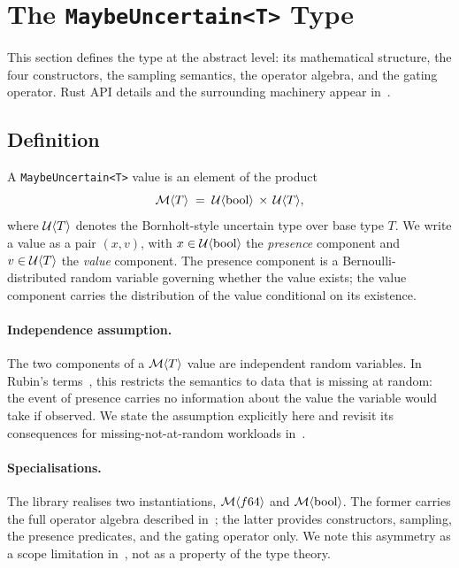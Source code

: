 \section{The \texttt{MaybeUncertain<T>} Type}
\label{sec:type}

This section defines the type at the abstract level: its mathematical
structure, the four constructors, the sampling semantics, the operator
algebra, and the gating operator. Rust API details and the surrounding
machinery appear in~.

\subsection{Definition}
\label{sec:type:def}

A \texttt{MaybeUncertain<T>} value is an element of the product
\begin{equation}
\mathcal{M}\langle T \rangle \;=\; \mathcal{U}\langle \mathrm{bool} \rangle \,\times\, \mathcal{U}\langle T \rangle,
\label{eq:mtype}
\end{equation}
where $\mathcal{U}\langle T \rangle$ denotes the Bornholt-style uncertain type
over base type $T$. We write a value as a pair $(x, v)$, with $x \in
\mathcal{U}\langle \mathrm{bool} \rangle$ the \emph{presence} component and $v \in
\mathcal{U}\langle T \rangle$ the \emph{value} component. The presence component
is a Bernoulli-distributed random variable governing whether the value
exists; the value component carries the distribution of the value
conditional on its existence.

\paragraph{Independence assumption.} The two components of a
$\mathcal{M}\langle T \rangle$ value are independent random variables. In Rubin's
terms~\cite{rubin1976missing}, this restricts the semantics to data that is
missing at random: the event of presence carries no information about the
value the variable would take if observed. We state the assumption
explicitly here and revisit its consequences for missing-not-at-random
workloads in~.

\paragraph{Specialisations.} The library realises two instantiations,
$\mathcal{M}\langle f64 \rangle$ and $\mathcal{M}\langle \mathrm{bool} \rangle$. The former
carries the full operator algebra described in~;
the latter provides constructors, sampling, the presence predicates, and the
gating operator only. We note this asymmetry as a scope limitation
in~, not as a property of the type theory.

